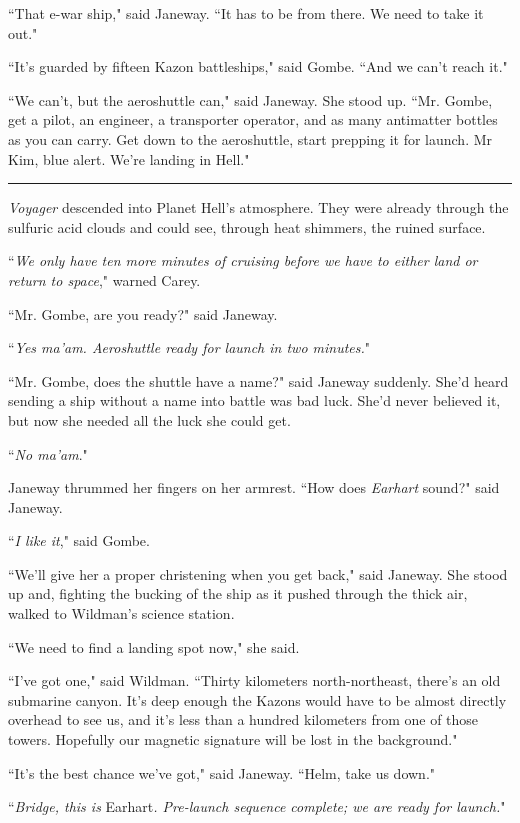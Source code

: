 \documentclass[twoside,letterpaper,12pt]{memoir}
\begin{document}
``That e-war ship," said Janeway. ``It has to be from there. We need to take it out."

``It's guarded by fifteen Kazon battleships," said Gombe. ``And we can't reach it."

``We can't, but the aeroshuttle can," said Janeway. She stood up. ``Mr. Gombe, get a pilot, an engineer, a transporter operator, and as many antimatter bottles as you can carry. Get down to the aeroshuttle, start prepping it for launch. Mr Kim, blue alert. We're landing in Hell."

\fancybreak{\rule{3cm}{0.4 pt}}
\textit{Voyager} descended into Planet Hell's atmosphere. They were already through the sulfuric acid clouds and could see, through heat shimmers, the ruined surface.

``\textit{We only have ten more minutes of cruising before we have to either land or return to space}," warned Carey.

``Mr. Gombe, are you ready?" said Janeway.

``\textit{Yes ma'am. Aeroshuttle ready for launch in two minutes.}"

``Mr. Gombe, does the shuttle have a name?" said Janeway suddenly. She'd heard sending a ship without a name into battle was bad luck. She'd never believed it, but now she needed all the luck she could get.

``\textit{No ma'am}."

Janeway thrummed her fingers on her armrest. ``How does \textit{Earhart} sound?" said Janeway.

``\textit{I like it}," said Gombe.

``We'll give her a proper christening when you get back," said Janeway. She stood up and, fighting the bucking of the ship as it pushed through the thick air, walked to Wildman's science station.

``We need to find a landing spot now," she said.

``I've got one," said Wildman. ``Thirty kilometers north-northeast, there's an old submarine canyon. It's deep enough the Kazons would have to be almost directly overhead to see us, and it's less than a hundred kilometers from one of those towers. Hopefully our magnetic signature will be lost in the background."

``It's the best chance we've got," said Janeway. ``Helm, take us down."

``\textit{Bridge, this is }Earhart\textit{. Pre-launch sequence complete; we are ready for launch.}"
\end{document}

